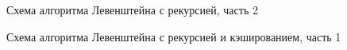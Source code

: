 \begin{figure}
	\caption{Схема алгоритма Левенштейна с рекурсией, часть 2}
\end{figure}

\begin{figure}
	\caption{Схема алгоритма Левенштейна с рекурсией и кэшированием, часть 1}
\end{figure}

